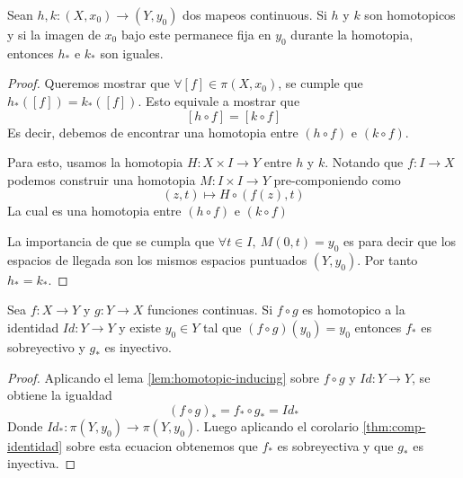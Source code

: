 \begin{lema} \label{lem:homotopic-inducing}
  Sean \(h,k : (X, x_0) \to (Y, y_0)\) dos mapeos continuous. Si \(h\) y
  \(k\) son homotopicos y si la imagen de \(x_0\) bajo este permanece
  fija en \(y_0\) durante la homotopia, entonces \(h_*\) e \(k_*\) son iguales.
\end{lema}
\begin{proof}
  Queremos mostrar que \(\forall [f] \in \pi (X,x_0)\), se cumple que
  \(h_* ([f]) = k_* ([f])\). Esto equivale a mostrar que
  \[ [h \circ f] = [k \circ f] \]
  Es decir, debemos de encontrar una homotopia entre \((h \circ f)\) e \(
  (k \circ f)\).

  Para esto, usamos la homotopia \(H : X \times I \to Y \) entre \(h\) y
  \(k\). Notando que \(f : I \to X\) podemos construir una homotopia \(M
  : I \times I \to Y \) pre-componiendo como
  \[ (z, t) \mapsto H \circ (f(z), t) \]
  La cual es una homotopia entre \((h \circ f)\) e \((k \circ f)\)

  La importancia de que se cumpla que \( \forall t \in I,\ M (0, t) =
  y_0\) es para decir que los espacios de llegada son los mismos
  espacios puntuados \((Y,y_0)\). Por tanto \(h_* = k_*\).
\end{proof}
\begin{teorema} \label{thm:comp-identidad-homotopia}
  Sea \(f : X \to Y\) y \(g : Y \to X\) funciones continuas. Si \(f
  \circ g\) es homotopico a la identidad \( Id : Y \to Y\) y existe
  \(y_0 \in Y\) tal que \( (f \circ g ) (y_0) = y_0 \) entonces
  \(f_*\) es sobreyectivo y \(g_*\) es inyectivo.
\end{teorema}
\begin{proof}
  Aplicando el lema \ref{lem:homotopic-inducing} sobre \(f \circ g \) y
  \( Id : Y \to Y\), se obtiene la igualdad
  \[ (f \circ g)_{*} = f_* \circ g_* = Id_* \]
  Donde \(Id_* : \pi (Y, y_0) \to \pi (Y, y_0)\). Luego aplicando el corolario
  \ref{thm:comp-identidad} sobre esta ecuacion obtenemos que \(f_*\) es
  sobreyectiva y que \(g_*\) es inyectiva.
\end{proof}

